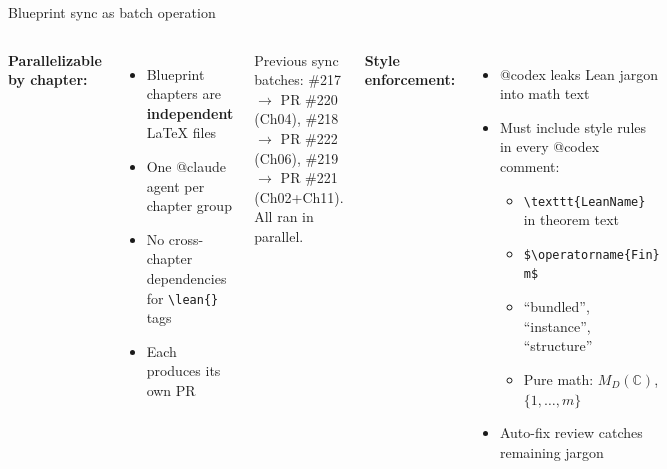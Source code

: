 \documentclass[aspectratio=169,10pt]{beamer}
\begin{document}
\begin{frame}{Blueprint sync as batch operation}
    \vspace{-0.2em}
    \begin{columns}[T]
        \textcolor{leangreen}{\textbf{Parallelizable by chapter:}}
        \vspace{0.3em}
        \begin{itemize}
            \item Blueprint chapters are \textbf{independent} \LaTeX{} files
            \item One @claude agent per chapter group
            \item No cross-chapter dependencies for \texttt{\textbackslash lean\{\}} tags
            \item Each produces its own PR
        \end{itemize}
        \vspace{0.3em}
        \textcolor{dimwhite}{\footnotesize Previous sync batches: \#217 $\to$ PR \#220 (Ch04), \#218 $\to$ PR \#222 (Ch06), \#219 $\to$ PR \#221 (Ch02+Ch11). All ran in parallel.}

        \textcolor{amber}{\textbf{Style enforcement:}}
        \vspace{0.3em}
        \begin{itemize}
            \item @codex leaks Lean jargon into math text
            \item Must include style rules in every @codex comment:
            \begin{itemize}
                \item[$\times$] \texttt{\textbackslash texttt\{LeanName\}} in theorem text
                \item[$\times$] \texttt{\$\textbackslash operatorname\{Fin\} m\$}
                \item[$\times$] ``bundled'', ``instance'', ``structure''
                \item[\checkmark] Pure math: $M_D(\mathbb{C})$, $\{1,\ldots,m\}$
            \end{itemize}
            \item Auto-fix review catches remaining jargon
        \end{itemize}
    \end{columns}
\end{frame}

\end{document}

